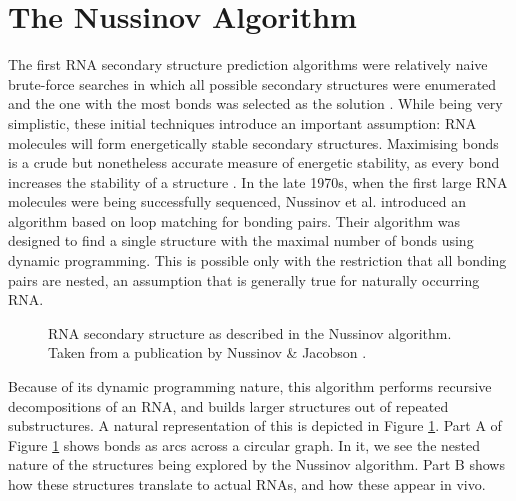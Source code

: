 \documentclass[12pt, a4paper]{article}
\begin{document}
\section*{The Nussinov Algorithm} 
The first RNA secondary structure prediction algorithms were relatively naive brute-force searches in which all possible secondary structures were enumerated and the one with
the most bonds was selected as the solution \cite{nussinov1978algorithms}. While being very simplistic,
these initial techniques introduce an important assumption: RNA molecules will
form energetically stable secondary structures. Maximising bonds is a crude but
nonetheless accurate measure of energetic stability, as every bond increases the
stability of a structure \cite{nussinov1978algorithms}. In the late 1970s, when the first large RNA molecules
were being successfully sequenced, Nussinov et al. \cite{nussinov1978algorithms} introduced an algorithm
based on loop matching for bonding pairs. Their algorithm was designed to find a
single structure with the maximal number of bonds using dynamic programming. This is possible only with the restriction that all bonding pairs are nested, an assumption that is generally true for naturally occurring RNA.

\begin{figure}
\begin{center}
\end{center}
\caption{RNA secondary structure as described in the Nussinov algorithm.
Taken from a publication by Nussinov \& Jacobson \cite{nussinov1980fast}.}
\label{figure1}
\end{figure}


Because of its dynamic programming nature, this algorithm performs recursive decompositions of an RNA, and builds
larger structures out of repeated substructures. A natural representation of this is
depicted in Figure \ref{figure1}. Part A of Figure \ref{figure1} shows bonds as arcs across a circular
graph. In it, we see the nested nature of the structures being explored by the
Nussinov algorithm. Part B shows how these structures translate to actual RNAs,
and how these appear in vivo.
\end{document}
